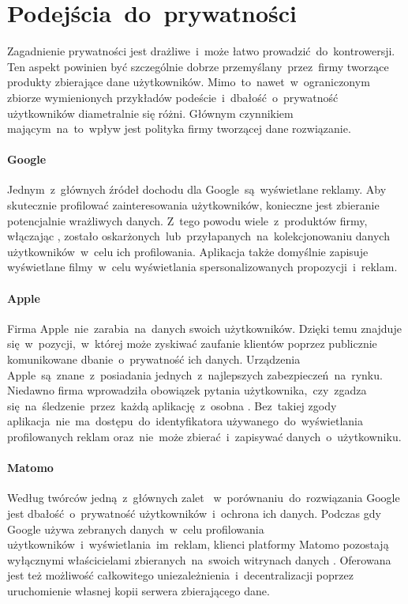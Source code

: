 \section{Podejścia~do~prywatności}
Zagadnienie prywatności jest drażliwe~i~może łatwo prowadzić~do~kontrowersji. Ten aspekt powinien być szczególnie dobrze przemyślany~przez~firmy tworzące produkty zbierające dane użytkowników. Mimo~to~nawet~w~ograniczonym zbiorze wymienionych przykładów podeście~i~dbałość~o~prywatność użytkowników diametralnie się różni. Głównym czynnikiem mającym~na~to~wpływ jest polityka firmy tworzącej dane rozwiązanie.

\paragraph{Google}
Jednym~z~głównych źródeł dochodu dla Google~są~wyświetlane reklamy. Aby skutecznie profilować zainteresowania użytkowników, konieczne jest zbieranie potencjalnie wrażliwych danych. Z~tego powodu wiele~z~produktów firmy, włączając , zostało oskarżonych~lub~przyłapanych~na~kolekcjonowaniu danych użytkowników~w~celu ich profilowania. Aplikacja  także domyślnie zapisuje wyświetlane filmy~w~celu wyświetlania spersonalizowanych propozycji~i~reklam.

\paragraph{Apple}
Firma Apple~nie~zarabia~na~danych swoich użytkowników. Dzięki temu znajduje się~w~pozycji,~w~której może zyskiwać zaufanie klientów poprzez publicznie komunikowane dbanie~o~prywatność ich danych. Urządzenia Apple~są~znane~z~posiadania jednych~z~najlepszych zabezpieczeń~na~rynku. Niedawno firma wprowadziła obowiązek pytania użytkownika,~czy~zgadza się~na~śledzenie~przez~każdą aplikację~z~osobna \cite{Apple_Ad_Transparency}. Bez~takiej zgody aplikacja~nie~ma~dostępu~do~identyfikatora używanego~do~wyświetlania profilowanych reklam oraz~nie~może zbierać~i~zapisywać danych~o~użytkowniku.

\paragraph{Matomo}
Według twórców jedną~z~głównych zalet ~w~porównaniu~do~rozwiązania Google jest dbałość~o~prywatność użytkowników~i~ochrona ich danych. Podczas gdy Google używa zebranych danych~w~celu profilowania użytkowników~i~wyświetlania~im~reklam, klienci platformy Matomo pozostają wyłącznymi właścicielami zbieranych~na~swoich witrynach danych \cite{Matomo_Data}. Oferowana jest też możliwość całkowitego uniezależnienia~i~decentralizacji poprzez uruchomienie własnej kopii serwera zbierającego dane.

